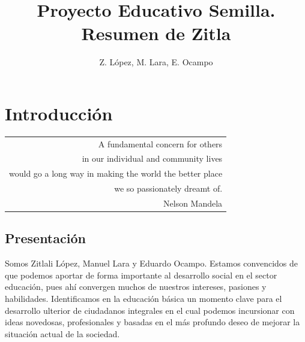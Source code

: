 \documentclass[10pt,letterpaper,oneside]{book}
\author{Z. López, M. Lara, E. Ocampo}
\title{Proyecto Educativo Semilla. Resumen de Zitla}
\makeatletter
\newenvironment{myepigraph}
  {\par\hfill\itshape
   \begin{tabular}{@{}r@{\hspace{2em}}}} %
  {\end{tabular}\par\medskip}
\makeatother
\begin{document}
\maketitle
\tableofcontents

\chapter{Introducción}

\begin{myepigraph}A fundamental concern for others\\
in our individual and community lives\\
would go a long way in making the world the better place\\
we so passionately dreamt of.
\vspace{0.1cm}\\
Nelson Mandela
\end{myepigraph}

\section{Presentación}

Somos Zitlali López, Manuel Lara y Eduardo Ocampo. Estamos convencidos de que podemos aportar de forma importante al desarrollo social en el sector educación, pues ahí convergen muchos de nuestros intereses, pasiones y habilidades. Identificamos en la educación básica un momento clave para el desarrollo ulterior de ciudadanos integrales en el cual podemos incursionar con ideas novedosas, profesionales y basadas en el más profundo deseo de mejorar la situación actual de la sociedad.
\end{document}
